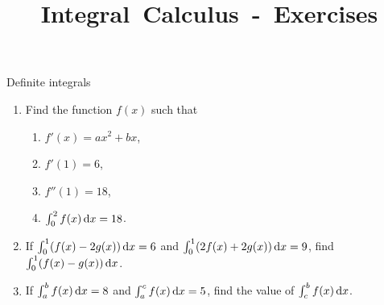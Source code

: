 \documentclass[9pt]{beamer}
\title{\huge \mbox{Integral Calculus - Exercises}}
\begin{document}
\maketitle

\begin{frame}{Definite integrals}

    \begin{enumerate}[leftmargin = 0.5cm, label = \arabic*., rightmargin = 0.2cm]
        
        \item Find the function $f(x)$ such that
        \begin{enumerate}[leftmargin = 0.5cm, label = (\roman*), rightmargin = 0.2cm]
        
            \item $f'(x) = ax^2 + bx$,

            \item $f'(1) = 6$,

            \item $f''(1) = 18$,

            \item $\int_0^2 f(x)\,\mathrm{d} x = 18$.
            
        \end{enumerate}

        \item If $\int_0^1 (f(x) - 2g(x))\,\mathrm{d} x = 6$ and $\int_0^1 (2f(x) + 2g(x))\,\mathrm{d} x = 9$, find $\int_0^1 (f(x) - g(x))\,\mathrm{d} x$.

        \item If $\int_a^b f(x)\,\mathrm{d} x = 8$ and $\int_a^c f(x)\,\mathrm{d} x = 5$, find the value of $\int_c^b f(x)\,\mathrm{d} x$.
        
    \end{enumerate}
    
\end{frame}
\end{document}
